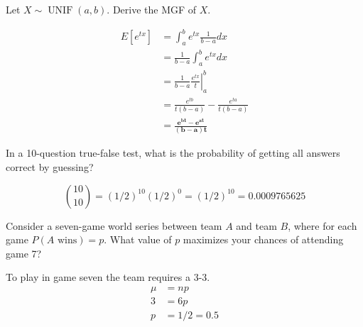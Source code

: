 \documentclass[answers]{exam}
\begin{document}
\begin{questions}
\question 
Let \(X\sim\operatorname{UNIF}(a,b)\). Derive the MGF of $X$.
\begin{solution}
	\begin{align*}
		E[e^{tx}] 
		&= \int_{a}^{b}e^{tx}\frac{1}{b-a}dx \\
		&= \frac{1}{b-a} \int_{a}^{b}e^{tx}dx \\
		&= \left. \frac{1}{b-a} \frac{e^{tx}}{t} \right|^b_a \\
		&= \frac{e^{tb}}{t(b-a)} - \frac{e^{ta}}{t(b-a)} \\
		&= \mathbf{\frac{e^{bt}-e^{at}}{(b-a)t}}
	\end{align*}
\end{solution}

\clearpage
\question 
In a 10-question true-false test, what is the probability of getting all answers correct by guessing?
\begin{solution}
	\[
	\binom{10}{10} = (1/2)^10(1/2)^0 = (1/2)^10 = 0.0009765625
	\]
\end{solution}

\question 
Consider a seven-game world series between team $A$ and team $B$, where for each game \(P(A\text{ wins})=p\). What value of $p$ maximizes your chances of attending game 7?
\begin{solution}
	To play in game seven the team requires a 3-3.
	\begin{align*}
		\mu &= np \\
		3 &= 6p \\
		p &= 1/2 = 0.5
	\end{align*}
\end{solution}

\end{questions}
\end{document}

